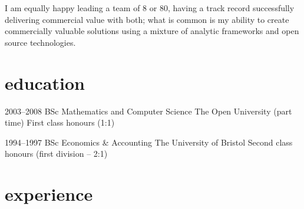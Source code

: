 \documentclass[]{friggeri-cv-a4}
\begin{document}
I am equally happy leading a team of 8 or 80, having a track record successfully delivering commercial value with both; what is common is my ability to create commercially valuable solutions using a mixture of analytic frameworks and open source technologies.





\section{education}

\begin{entrylist}


\entry
{2003--2008}
{BSc {\normalfont Mathematics and Computer Science}}
{The Open University (part time)}
{First class honours (1:1)}


\entry
{1994--1997}
{BSc {\normalfont Economics \& Accounting}}
{The University of Bristol}
{Second class honours (first division -- 2:1)}


\end{entrylist}


\section{experience}

\end{document}
